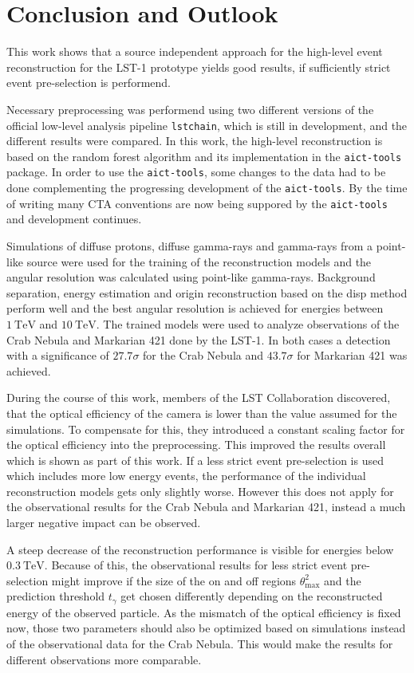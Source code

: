 \chapter{Conclusion and Outlook}
This work shows that a source independent approach for the high-level event reconstruction for the LST-1 prototype yields good results, 
if sufficiently strict event pre-selection is performend.

Necessary preprocessing was performend using two different versions of the official low-level analysis pipeline \texttt{lstchain}, which is still 
in development, and the different results were compared.
In this work, the high-level reconstruction is based on the random forest algorithm and its implementation in the \texttt{aict-tools} package.
In order to use the \texttt{aict-tools}, some changes to the data had to be done complementing the progressing development of the \texttt{aict-tools}.
By the time of writing many CTA conventions are now being suppored by the \texttt{aict-tools} and development continues.

Simulations of diffuse protons, diffuse gamma-rays and gamma-rays from a point-like source were used for the training of the reconstruction models and
the angular resolution was calculated using point-like gamma-rays.
Background separation, energy estimation and origin reconstruction based on the disp method perform well and the best angular resolution is 
achieved for energies between $\SI{1}{\tera\electronvolt}$ and $\SI{10}{\tera\electronvolt}$.
The trained models were used to analyze observations of the Crab Nebula and Markarian 421 done by the LST-1.
In both cases a detection with a significance of $\num{27.7} \sigma$ for the Crab Nebula and $\num{43.7} \sigma$ for Markarian 421 was achieved.

During the course of this work, members of the LST Collaboration discovered, that the optical efficiency of the camera is lower than 
the value assumed for the simulations.
To compensate for this, they introduced a constant scaling factor for the optical efficiency into the preprocessing.
This improved the results overall which is shown as part of this work.
If a less strict event pre-selection is used which includes more low energy events, the performance of the individual reconstruction models gets only slightly worse.
However this does not apply for the observational results for the Crab Nebula and Markarian 421, instead a much larger negative impact can be observed.

A steep decrease of the reconstruction performance is visible for energies below $\SI{0.3}{\tera\electronvolt}$.
Because of this, the observational results for less strict event pre-selection might improve if the size of the on and off regions $\theta_\text{max}^2$ and the
prediction threshold $t_\gamma$ get chosen differently depending on the reconstructed energy of the observed particle.
As the mismatch of the optical efficiency is fixed now, those two parameters should also be optimized based on simulations instead of the observational data 
for the Crab Nebula.
This would make the results for different observations more comparable.

